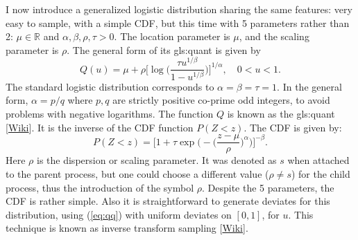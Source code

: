 \documentclass[10pt]{article}
\begin{document}
I now introduce a \textcolor{index}{generalized logistic distribution} sharing the same features: very easy to sample, with a simple CDF, but this time with 5 parameters rather than 2: $\mu\in\mathbb{R}$ and $\alpha,\beta,\rho,\tau>0$. The location parameter is $\mu$, and the scaling parameter is $\rho$. The general form of its
\gls{gls:quant} is given by
\begin{equation}
Q(u)=\mu+\rho\Big[\log \Big(\frac{\tau u^{1/\beta}}{1-u^{1/\beta}}\Big)\Big]^{1/\alpha}, \quad 0<u<1. \label{eq:qq}
\end{equation}
The standard \textcolor{index}{logistic distribution} corresponds to $\alpha=\beta=\tau=1$. In the general form, $\alpha=p/q$ where $p,q$ are strictly positive co-prime odd integers, to avoid problems with negative logarithms. The function $Q$ is known
as the \gls{gls:quant} [\href{https://en.wikipedia.org/wiki/Quantile_function}{Wiki}]. It is the inverse of the CDF function $P(Z<z)$. The CDF is given by:
\begin{equation}
P(Z<z) = \Big[1+\tau \exp\Big(-\Big(\frac{z-\mu}{\rho}\Big)^\alpha\Big) \Big]^{-\beta}. \label{eq:gld1}
\end{equation}
Here $\rho$ is the dispersion or scaling parameter. It was denoted as $s$ when attached to the parent process, but one could choose a different value ($\rho\neq s$) for the child process, thus the introduction of the symbol $\rho$.  Despite the 5 parameters, the CDF is rather simple. Also it is straightforward to generate deviates for this distribution, using (\ref{eq:qq}) with uniform deviates on $[0, 1]$, for $u$. This technique is known as
\textcolor{index}{inverse transform sampling} [\href{https://en.wikipedia.org/wiki/Inverse_transform_sampling}{Wiki}].
\end{document}
